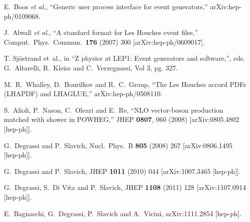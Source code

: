\documentclass[paper]{JHEP3}
\begin{document}
\begin{thebibliography}{10}
  E.~Boos {\it et al.},
  ``Generic user process interface for event generators,''
  arXiv:hep-ph/0109068.

  J.~Alwall {\it et al.},
  ``A standard format for Les Houches event files,''
  Comput.\ Phys.\ Commun.\  {\bf 176} (2007) 300
  [arXiv:hep-ph/0609017].


 T. Sj\"ostrand et~al., in
  ``Z physics at LEP1: Event generators and software,'',  eds.
  G.~Altarelli, R.~Kleiss and C.~Verzegnassi, Vol 3, pg. 327.


  M.~R.~Whalley, D.~Bourilkov and R.~C.~Group,
  ``The Les Houches accord PDFs (LHAPDF) and LHAGLUE,''
  arXiv:hep-ph/0508110.


  S.~Alioli, P.~Nason, C.~Oleari and E.~Re,
  ``NLO vector-boson production matched with shower in POWHEG,''
  JHEP {\bf 0807}, 060 (2008)
  [arXiv:0805.4802 [hep-ph]].



  G.~Degrassi and P.~Slavich,
  Nucl.\ Phys.\ B {\bf 805} (2008) 267
  [arXiv:0806.1495 [hep-ph]].

  G.~Degrassi and P.~Slavich,
  JHEP {\bf 1011} (2010) 044
  [arXiv:1007.3465 [hep-ph]].

  G.~Degrassi, S.~Di Vita and P.~Slavich,
  JHEP {\bf 1108} (2011) 128
  [arXiv:1107.0914 [hep-ph]].

  E.~Bagnaschi, G.~Degrassi, P.~Slavich and A.~Vicini,
  arXiv:1111.2854 [hep-ph].

\end{thebibliography}
\end{document}
